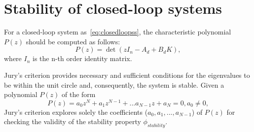 \documentclass[runningheads,a4paper]{llncs}
\newcommand{\addtodo}[1]{{\color{red} TODO: #1}}
\begin{document}
\newpage


  

\newpage
\appendix
\section{Stability of closed-loop systems}
\label{sec:appendix-stability}


For a closed-loop system as~\eqref{eq:closedloopss}, 
the characteristic polynomial $P(z)$ should be computed as follows:
\begin{equation}
P(z)= \det( z I_{n} - A_d + B_d K ),
\end{equation}
where $I_{n}$ is the n-th order identity matrix. 

Jury's criterion provides necessary and sufficient conditions for the eigenvalues 
to be within the unit circle and, consequently, the system is stable.  Given a 
polynomial $P(z)$ of the form
$$
P(z) = a_{0}z^{N} + a_{1}z^{N-1} + ... a_{N-1}z + a_{N} = 0, a_{0}\neq 0,
$$
Jury's criterion explores solely the coefficients ($a_{0},a_{1},...,a_{N-1}$) 
of $P(z)$ for checking the validity of the stability property $\phi_{stability}$. 
\end{document}
